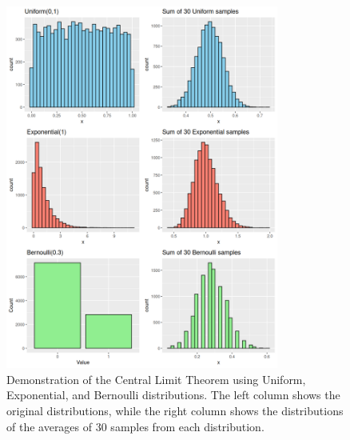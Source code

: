\documentclass[11pt]{article}
\begin{document}
  \begin{figure}
    \centering
    \includegraphics[width=0.8\textwidth]{figures/clt_demo.png}
    \caption{Demonstration of the Central Limit Theorem using Uniform, Exponential, and Bernoulli distributions. The left column shows the original distributions, while the right column shows the distributions of the averages of 30 samples from each distribution.}
    \label{fig:clt_demo}
  \end{figure}

\fi
\end{document}
